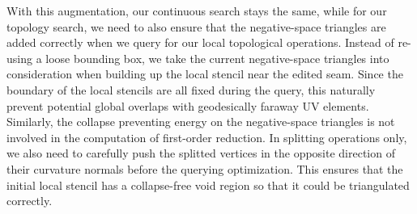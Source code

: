 With this augmentation, our continuous search stays the same, while for our topology search, we need to also ensure that the negative-space triangles are added correctly when we query for our local topological operations.
Instead of re-using a loose bounding box, we take the current negative-space triangles into consideration when building up the local stencil near the edited seam. Since the boundary of the local stencils are all fixed during the query, this naturally prevent potential global overlaps with geodesically faraway UV elements. Similarly, the collapse preventing energy on the negative-space triangles is not involved in the computation of first-order reduction.
In splitting operations only, we also need to carefully push the splitted vertices in the opposite direction of their curvature normals before the querying optimization. This ensures that the initial local stencil has a collapse-free void region so that it could be triangulated correctly.



